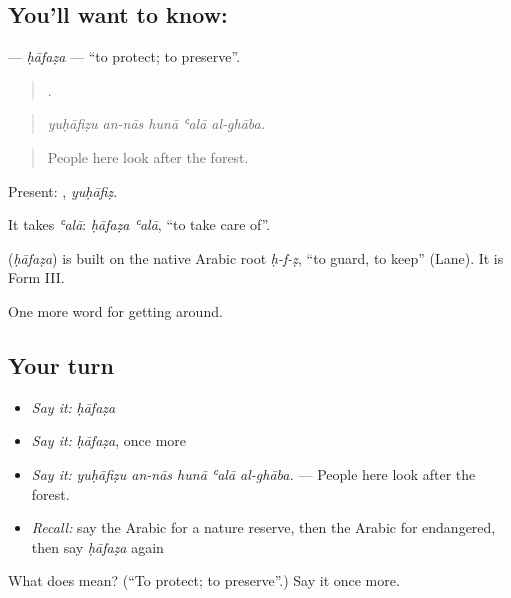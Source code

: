 \subsection*{You'll want to know: }
\textbf{} — \emph{ḥāfaẓa} — \textquotedblleft{}to protect; to preserve\textquotedblright{}.

\begin{quote}
    .
\end{quote}

\begin{quote}
\emph{yuḥāfiẓu an-nās hunā ʿalā al-ghāba.}
\end{quote}

\begin{quote}
People here look after the forest.
\end{quote}

Present: , \emph{yuḥāfiẓ}.

It takes \emph{ʿalā}: \emph{ḥāfaẓa ʿalā}, \textquotedblleft{}to take care of\textquotedblright{}.

\begin{cousinweb}
\textbf{} (\emph{ḥāfaẓa}) is built on the native Arabic root \emph{ḥ-f-ẓ}, \textquotedblleft{}to guard, to keep\textquotedblright{} (Lane). It is Form III.
\end{cousinweb}

\begin{grammarlens}[title={What you've built}]
One more word for getting around.
\end{grammarlens}

\subsection*{Your turn}
\begin{itemize}
\raggedright
  \item \emph{Say it:} \emph{ḥāfaẓa}
  \item \emph{Say it:} \emph{ḥāfaẓa}, once more
  \item \emph{Say it:} \emph{yuḥāfiẓu an-nās hunā ʿalā al-ghāba.} — People here look after the forest.
  \item \emph{Recall:} say the Arabic for a nature reserve, then the Arabic for endangered, then say \emph{ḥāfaẓa} again
\end{itemize}

\begin{tcolorbox}[breakable,colback=teal!4,colframe=teal!35!black,title={Before you move on}]
What does  mean? (\textquotedblleft{}To protect; to preserve\textquotedblright{}.) Say it once more.
\end{tcolorbox}
